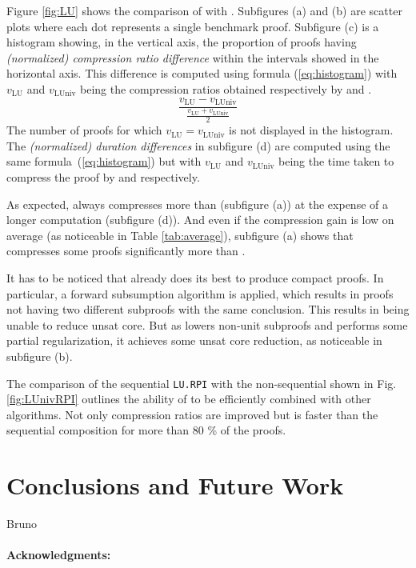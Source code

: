 \documentclass{llncs}
\begin{document}
\newcommand{\va}[1]{\ensuremath{v_{\text{#1}}}}

Figure \ref{fig:LU} shows the comparison of {\LowerUnits} with {\LowerUnivalents}. Subfigures (a) and (b) are scatter plots where each dot represents a single benchmark proof. 
Subfigure (c) is a histogram showing, in the vertical axis, the proportion of proofs having \emph{(normalized) compression ratio difference} within the intervals showed in the horizontal axis. This difference is computed using formula (\ref{eq:histogram}) with \va{LU}
and \va{LUniv} being the compression ratios obtained respectively by {\LowerUnits} and
{\LowerUnivalents}.
\begin{equation} \label{eq:histogram}
  \frac { \va{LU} - \va{LUniv} }{ \frac{\va{LU} + \va{LUniv}}{2} }
\end{equation}
The number of proofs for which $\va{LU} = \va{LUniv}$ is not displayed in the histogram.
The \emph{(normalized) duration differences} in subfigure (d) are computed using the same formula~(\ref{eq:histogram}) but
with \va{LU} and \va{LUniv} being the time taken to compress the proof by {\LowerUnits} and
{\LowerUnivalents} respectively.



As expected, {\LowerUnivalents} always compresses more than {\LowerUnits} (subfigure (a)) at the expense of a longer
computation (subfigure (d)). And even if the compression gain is low on average (as noticeable in Table \ref{tab:average}), subfigure (a) shows that {\LowerUnivalents} compresses some proofs significantly more than {\LowerUnits}.

It has to be noticed that \veriT already does its best to produce compact proofs. In particular,
a forward subsumption algorithm is applied, which results in proofs not having two different subproofs
with the same conclusion. This results in {\LowerUnits} being unable to reduce unsat core.
But as {\LowerUnivalents} lowers non-unit subproofs and performs some partial regularization, it
achieves some unsat core reduction, as noticeable in subfigure (b).

The comparison of the sequential \texttt{LU.RPI} with the non-sequential {\LUnivRPI} shown in Fig.
\ref{fig:LUnivRPI} outlines the ability of {\LowerUnivalents} to be efficiently combined with other
algorithms. Not only compression ratios are improved but {\LUnivRPI} is faster than the sequential
composition for more than 80 \% of the proofs.







\section{Conclusions and Future Work}

Bruno


\vspace{-10pt}
\paragraph{Acknowledgments:}





\end{document}
